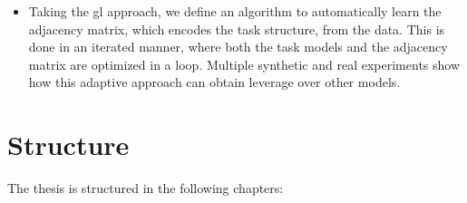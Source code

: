 \begin{itemize}
    \item Taking the \acrshort{gl} approach, we define an algorithm to automatically learn the adjacency matrix, which encodes the task structure, from the data. This is done in an iterated manner, where both the task models and the adjacency matrix are optimized in a loop. Multiple synthetic and real experiments show how this adaptive approach can obtain leverage over other models.
\end{itemize}









\section{Structure}

The thesis is structured in the following chapters:

